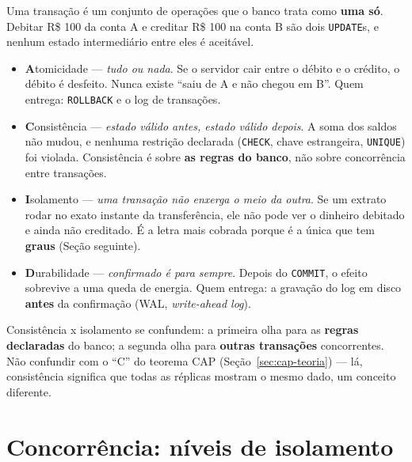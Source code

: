 \begin{conceito}
Uma transação é um conjunto de operações que o banco trata como
\textbf{uma só}. Debitar R\$ 100 da conta A e creditar R\$ 100 na conta B
são dois \texttt{UPDATE}s, e nenhum estado intermediário entre eles é
aceitável.

\begin{itemize}
\item \textbf{A}tomicidade --- \textit{tudo ou nada}. Se o servidor cair
entre o débito e o crédito, o débito é desfeito. Nunca existe “saiu de A
e não chegou em B”. Quem entrega: \texttt{ROLLBACK} e o log de
transações.
\item \textbf{C}onsistência --- \textit{estado válido antes, estado
válido depois}. A soma dos saldos não mudou, e nenhuma restrição
declarada (\texttt{CHECK}, chave estrangeira, \texttt{UNIQUE}) foi
violada. Consistência é sobre \textbf{as regras do banco}, não sobre
concorrência entre transações.
\item \textbf{I}solamento --- \textit{uma transação não enxerga o meio da
outra}. Se um extrato rodar no exato instante da transferência, ele não
pode ver o dinheiro debitado e ainda não creditado. É a letra mais
cobrada porque é a única que tem \textbf{graus} (Seção seguinte).
\item \textbf{D}urabilidade --- \textit{confirmado é para sempre}. Depois
do \texttt{COMMIT}, o efeito sobrevive a uma queda de energia. Quem
entrega: a gravação do log em disco \textbf{antes} da confirmação (WAL,
\textit{write-ahead log}).
\end{itemize}
\end{conceito}

\begin{cuidado}
Consistência x isolamento se confundem: a primeira olha para as
\textbf{regras declaradas} do banco; a segunda olha para \textbf{outras
transações} concorrentes. Não confundir com o “C” do teorema CAP
(Seção~\ref{sec:cap-teoria}) --- lá, consistência significa que todas as
réplicas mostram o mesmo dado, um conceito diferente.
\end{cuidado}

\section{Concorrência: níveis de isolamento}

